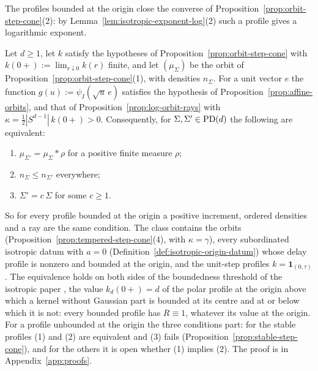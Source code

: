 The profiles bounded at the origin close the converse of Proposition~\ref{prop:orbit-step-cone}(2):
by Lemma~\ref{lem:isotropic-exponent-log}(2) such a profile gives a logarithmic exponent.

\begin{proposition}\label{prop:bounded-profile-rays}
Let $d \ge 1$, let $k$ satisfy the hypotheses of Proposition~\ref{prop:orbit-step-cone} with
$k(0{+}) := \lim_{r\downarrow0}k(r)$ finite, and let $(\mu_\Sigma)$ be the orbit of
Proposition~\ref{prop:orbit-step-cone}(1), with \Levy{} densities $n_\Sigma$. For a unit vector $e$ the function
$g(u) := \psi_I(\sqrt u\,e)$ satisfies the hypothesis of Proposition~\ref{prop:affine-orbits}, and that of
Proposition~\ref{prop:log-orbit-rays} with $\kappa = \tfrac12|S^{d-1}|\,k(0{+}) > 0$. Consequently, for
$\Sigma, \Sigma' \in \mathrm{PD}(d)$ the following are equivalent:
\begin{enumerate}
\item $\mu_{\Sigma'} = \mu_\Sigma * \rho$ for a positive finite measure $\rho$;
\item $n_\Sigma \le n_{\Sigma'}$ everywhere;
\item $\Sigma' = c\,\Sigma$ for some $c \ge 1$.
\end{enumerate}
\end{proposition}

So for every profile bounded at the origin a positive increment, ordered \Levy{} densities and a ray
are the same condition. The class contains the \Matern{} orbits
(Proposition~\ref{prop:tempered-step-cone}(4), with $\kappa = \gamma$), every subordinated isotropic
datum with $a = 0$ (Definition~\ref{def:isotropic-origin-datum}) whose delay profile is nonzero and bounded at the
origin, and the unit-step profiles
$k = \mathbf 1_{(0,\tau)}$. The equivalence holds on both sides of the boundedness threshold of the isotropic paper
, the value $k_d(0{+}) = d$ of the polar profile at the origin above which a
kernel without Gaussian part is bounded at its centre and at or below which it is not: every bounded
profile has $R \equiv 1$, whatever its value at the origin. For a profile unbounded at the origin the
three conditions part: for the stable profiles (1) and (2) are equivalent and (3) fails
(Proposition~\ref{prop:stable-step-cone}), and for the others it is open whether (1) implies (2).
The proof is in Appendix~\ref{app:proofs}.

